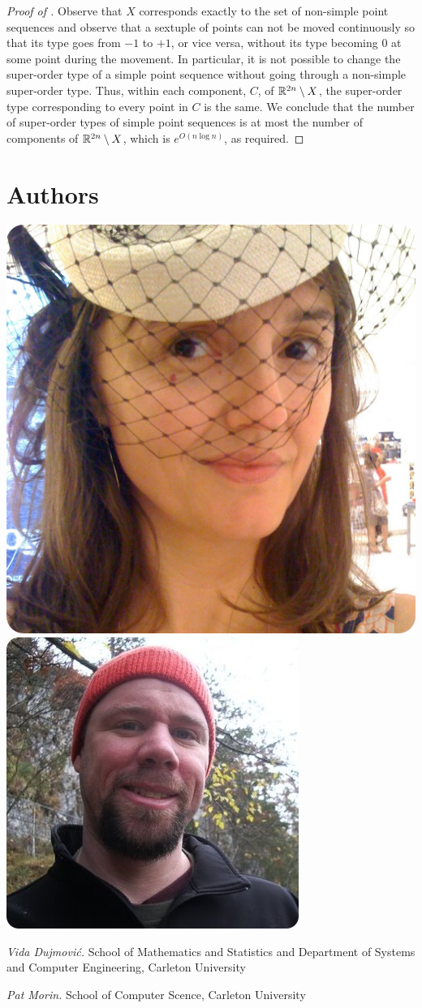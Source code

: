 \documentclass{patmorin}
\begin{document}
\begin{proof}[Proof of ]
   Observe that $X$ corresponds exactly to the set of non-simple
   point sequences and observe that a sextuple of points can not be moved
   continuously so that its type goes from $-1$ to $+1$, or vice versa,
   without its type becoming $0$ at some point during the movement.
   In particular, it is not possible to change the super-order type of
   a simple point sequence without going through a non-simple super-order type.
   Thus, within each component, $C$, of $\mathbb{R}^{2n}\setminus X$, the
   super-order type corresponding to every point in $C$ is the same.
   We conclude that the number of super-order types of simple point
   sequences is at most the number of components of $\mathbb{R}^{2n}\setminus X$,
   which is $e^{O(n\log n)}$, as required.
\end{proof}

\section*{Authors}

\noindent
\includegraphics[width=.45\textwidth]{vida-b}%
\hspace{.1\textwidth}%
\includegraphics[width=.45\textwidth]{pat-b}%

\noindent\emph{Vida Dujmovi\'c.}
School of Mathematics and Statistics and Department of Systems and Computer Engineering, Carleton University

\noindent\emph{Pat Morin.}
School of Computer Scence, Carleton University
\end{document}
